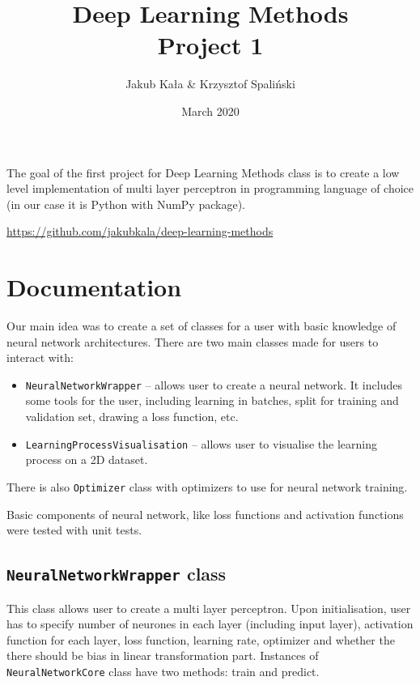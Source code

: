 \documentclass[a4]{article}
\title{Deep Learning Methods \\ Project 1}
\author{Jakub Kała \& Krzysztof Spaliński}
\date{March 2020}
\begin{document}
\maketitle


The goal of the first project for Deep Learning Methods class is to create a low level implementation of multi layer perceptron in programming language of choice (in our case it is Python with NumPy package).

\begin{center}
	\href{https://github.com/jakubkala/deep-learning-methods}{https://github.com/jakubkala/deep-learning-methods}
\end{center}

\tableofcontents
\vspace{2em}


 

\newpage
\section{Documentation}

Our main idea was to create a set of classes for a user with basic knowledge of neural network architectures. There are two main classes made for users to interact with: 
\begin{itemize}
\itemsep0em 
	\item \texttt{NeuralNetworkWrapper} -- allows user to create a neural network. It includes some tools for the user, including learning in batches, split for training and validation set, drawing a loss function, etc.
	\item \texttt{LearningProcessVisualisation} -- allows user to visualise the learning process on a 2D dataset.
\end{itemize}
There is also \texttt{Optimizer} class with optimizers to use for neural network training.  

Basic components of neural network, like loss functions and activation functions were tested with unit tests. 

\subsection{\texttt{NeuralNetworkWrapper} class}
This class allows user to create a multi layer perceptron. Upon initialisation, user has to specify number of neurones in each layer (including input layer), activation function for each layer, loss function, learning rate, optimizer and whether the there should be bias in linear transformation part. Instances of \texttt{NeuralNetworkCore} class have two methods: train and predict. 
\end{document}
